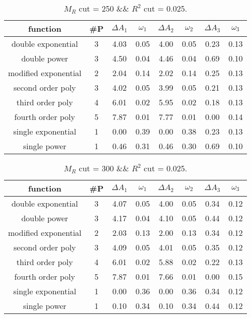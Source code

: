  
\begin{table}[H] 
\begin{center} 
\begin{tabular}{|c|c|cc|cc|cc|} 
\hline function & \#P & $\Delta A_1$ & $\omega_1$ & $\Delta A_2$ & $\omega_2$ & $\Delta A_3$ & $\omega_3$ \\ \hline 
double exponential &  3 &   4.03 &   0.05 &   4.00 &   0.05 &   0.23 &   0.13 \\ 
double power &  3 &   4.50 &   0.04 &   4.46 &   0.04 &   0.69 &   0.10 \\ 
modified exponential &  2 &   2.04 &   0.14 &   2.02 &   0.14 &   0.25 &   0.13 \\ 
second order poly &  3 &   4.02 &   0.05 &   3.99 &   0.05 &   0.21 &   0.13 \\ 
third order poly &  4 &   6.01 &   0.02 &   5.95 &   0.02 &   0.18 &   0.13 \\ 
fourth order poly &  5 &   7.87 &   0.01 &   7.77 &   0.01 &   0.00 &   0.14 \\ 
single exponential &  1 &   0.00 &   0.39 &   0.00 &   0.38 &   0.23 &   0.13 \\ 
single power &  1 &   0.46 &   0.31 &   0.46 &   0.30 &   0.69 &   0.10 \\ 
\hline 
\end{tabular} 
\caption{$M_R$ cut = 250 \&\& $R^2$ cut = 0.025.} 
\label{tab:FitChoices_250_0.025} 
\end{center} 
\end{table} 
 
 
\begin{table}[H] 
\begin{center} 
\begin{tabular}{|c|c|cc|cc|cc|} 
\hline function & \#P & $\Delta A_1$ & $\omega_1$ & $\Delta A_2$ & $\omega_2$ & $\Delta A_3$ & $\omega_3$ \\ \hline 
double exponential &  3 &   4.07 &   0.05 &   4.00 &   0.05 &   0.34 &   0.12 \\ 
double power &  3 &   4.17 &   0.04 &   4.10 &   0.05 &   0.44 &   0.12 \\ 
modified exponential &  2 &   2.03 &   0.13 &   2.00 &   0.13 &   0.34 &   0.12 \\ 
second order poly &  3 &   4.09 &   0.05 &   4.01 &   0.05 &   0.35 &   0.12 \\ 
third order poly &  4 &   6.01 &   0.02 &   5.88 &   0.02 &   0.22 &   0.13 \\ 
fourth order poly &  5 &   7.87 &   0.01 &   7.66 &   0.01 &   0.00 &   0.15 \\ 
single exponential &  1 &   0.00 &   0.36 &   0.00 &   0.36 &   0.34 &   0.12 \\ 
single power &  1 &   0.10 &   0.34 &   0.10 &   0.34 &   0.44 &   0.12 \\ 
\hline 
\end{tabular} 
\caption{$M_R$ cut = 300 \&\& $R^2$ cut = 0.025.} 
\label{tab:FitChoices_300_0.025} 
\end{center} 
\end{table} 
 
